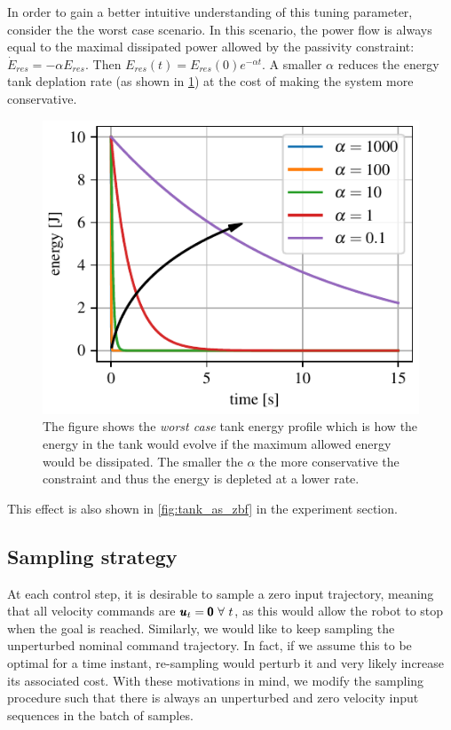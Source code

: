 In order to gain a better intuitive understanding of this tuning parameter, consider the the worst case scenario. In this scenario, the power flow is always equal to the maximal dissipated power allowed by the passivity constraint: $\dot{E}_{res} = - \alpha E_{res}$. Then $E_{res}(t) = E_{res}(0) e^{-\alpha t}$. A smaller $\alpha$ reduces the energy tank deplation rate  (as shown in \fig \ref{fig:worst_case_energy_profile}) at the cost of making the system more conservative.
\begin{figure}[t]
    \centering
    \includegraphics[width=0.8\columnwidth]{figures/worst_case_energy_profile.pdf}
    \caption{The figure shows the \textit{worst case} tank energy profile which is how the energy in the tank would evolve if the maximum allowed energy would be dissipated. The smaller the $\alpha$ the more conservative the constraint and thus the energy is depleted at a lower rate.}
    \label{fig:worst_case_energy_profile}
\end{figure}
This effect is also shown in \fig \ref{fig:tank_as_zbf} in the experiment section.

\subsection{Sampling strategy}
At each control step, it is desirable to sample a zero input trajectory, meaning that all velocity commands are $\pmb{u}_t = \pmb{0}\ \forall\ t$, as this would allow the robot to stop when the goal is reached. Similarly, we would like to keep sampling the unperturbed nominal command trajectory. In fact, if we assume this to be optimal for a time instant, re-sampling would perturb it and very likely increase its associated cost. With these motivations in mind, we modify the sampling procedure such that there is always an unperturbed and zero velocity input sequences in the batch of samples.

